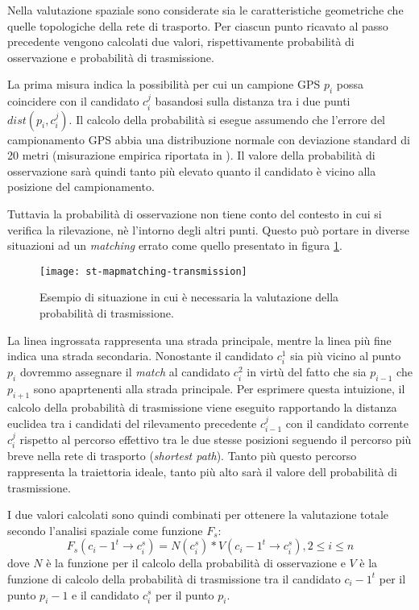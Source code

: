 Nella valutazione spaziale sono considerate sia le caratteristiche geometriche che quelle topologiche della rete di trasporto. Per ciascun punto ricavato al passo precedente vengono calcolati due valori, rispettivamente probabilità di osservazione e probabilità di trasmissione.

La prima misura indica la possibilità per cui un campione GPS $p_i$ possa coincidere con il candidato $c_i^j$ basandosi sulla distanza tra i due punti $dist(p_i, c_i^j)$. Il calcolo della probabilità si esegue assumendo che l'errore del campionamento GPS abbia una distribuzione normale con deviazione standard di 20 metri (misurazione empirica riportata in \cite[paragrafo 5.2]{stmapmatching}). Il valore della probabilità di osservazione sarà quindi tanto più elevato quanto il candidato è vicino alla posizione del campionamento. 

Tuttavia la probabilità di osservazione non tiene conto del contesto in cui si verifica la rilevazione, nè l'intorno degli altri punti. Questo può portare in diverse situazioni ad un \emph{matching} errato come quello presentato in figura \ref{fig:st-mapmatching-transmission}.

\begin{figure}[h]
  \centering
  \texttt{[image: st-mapmatching-transmission]}
  \caption{\footnotesize{Esempio di situazione in cui è necessaria la valutazione della probabilità di trasmissione.}}
  \label{fig:st-mapmatching-transmission}
\end{figure}
La linea ingrossata rappresenta una strada principale, mentre la linea più fine indica una strada secondaria. Nonostante il candidato $c_i^1$ sia più vicino al punto $p_i$ dovremmo assegnare il \emph{match} al candidato $c_i^2$ in virtù del fatto che sia $p_{i-1}$ che $p_{i+1}$ sono apaprtenenti alla strada principale. Per esprimere questa intuizione, il calcolo della probabilità di trasmissione viene eseguito rapportando la distanza euclidea tra i candidati del rilevamento precedente $c_{i-1}^j$ con il candidato corrente $c_i^j$ rispetto al percorso effettivo tra le due stesse posizioni seguendo il percorso più breve nella rete di trasporto (\emph{shortest path}). Tanto più questo percorso rappresenta la traiettoria ideale, tanto più alto sarà il valore dell probabilità di trasmissione.

I due valori calcolati sono quindi combinati per ottenere la valutazione totale secondo l'analisi spaziale come funzione $F_s$:
$$ F_s(c_i-1^t \rightarrow c_i^s) = N(c_i^s) * V(c_i-1^t \rightarrow c_i^s), 2 \leq i \leq n $$
dove $N$ è la funzione per il calcolo della probabilità di osservazione e $V$ è la funzione di calcolo della probabilità di trasmissione tra il candidato $c_i-1^t$ per il punto $p_i-1$ e il candidato $c_i^s$ per il punto $p_i$.

